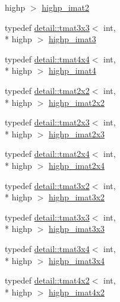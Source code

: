 \begin{DoxyCompactItemize}
highp $>$ \hyperlink{group__gtc__matrix__integer_ga70eae282157f23589db24f4664bbf956}{highp\-\_\-imat2}
\item 
typedef \hyperlink{structglm_1_1detail_1_1tmat3x3}{detail\-::tmat3x3}$<$ int, \\*
highp $>$ \hyperlink{group__gtc__matrix__integer_gaf12b3aa7e16a88b1fcf51be9a132048c}{highp\-\_\-imat3}
\item 
typedef \hyperlink{structglm_1_1detail_1_1tmat4x4}{detail\-::tmat4x4}$<$ int, \\*
highp $>$ \hyperlink{group__gtc__matrix__integer_ga9ca2f5624891bd1ac993fcde4dd24ac1}{highp\-\_\-imat4}
\item 
typedef \hyperlink{structglm_1_1detail_1_1tmat2x2}{detail\-::tmat2x2}$<$ int, \\*
highp $>$ \hyperlink{group__gtc__matrix__integer_ga9646ff5ef973234755e63e727c5a37fc}{highp\-\_\-imat2x2}
\item 
typedef \hyperlink{structglm_1_1detail_1_1tmat2x3}{detail\-::tmat2x3}$<$ int, \\*
highp $>$ \hyperlink{group__gtc__matrix__integer_ga7b7079ab95ac8f533ac565fcf1341c76}{highp\-\_\-imat2x3}
\item 
typedef \hyperlink{structglm_1_1detail_1_1tmat2x4}{detail\-::tmat2x4}$<$ int, \\*
highp $>$ \hyperlink{group__gtc__matrix__integer_ga84aec2e744ecac589fe8d502266e8efc}{highp\-\_\-imat2x4}
\item 
typedef \hyperlink{structglm_1_1detail_1_1tmat3x2}{detail\-::tmat3x2}$<$ int, \\*
highp $>$ \hyperlink{group__gtc__matrix__integer_ga9780c1bc052a34c59dc95f4dd9e1a5c8}{highp\-\_\-imat3x2}
\item 
typedef \hyperlink{structglm_1_1detail_1_1tmat3x3}{detail\-::tmat3x3}$<$ int, \\*
highp $>$ \hyperlink{group__gtc__matrix__integer_ga4e7c11e49de5d71067b95a87c84308a8}{highp\-\_\-imat3x3}
\item 
typedef \hyperlink{structglm_1_1detail_1_1tmat3x4}{detail\-::tmat3x4}$<$ int, \\*
highp $>$ \hyperlink{group__gtc__matrix__integer_ga97ddf84f7ae0c5d4d3ecc18bb1d47449}{highp\-\_\-imat3x4}
\item 
typedef \hyperlink{structglm_1_1detail_1_1tmat4x2}{detail\-::tmat4x2}$<$ int, \\*
highp $>$ \hyperlink{group__gtc__matrix__integer_gad998dce143f674a95a25241ff6e5e7d2}{highp\-\_\-imat4x2}
\item 

\end{DoxyCompactItemize}
